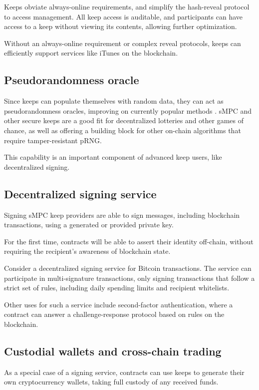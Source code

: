 \documentclass[11pt]{article}
\begin{document}
Keeps obviate always-online requirements, and simplify the hash-reveal
protocol to access management. All keep access is auditable, and
participants can have access to a keep without viewing its contents,
allowing further optimization.

Without an always-online requirement or complex reveal protocols,
keeps can efficiently support services like iTunes on the blockchain.

\subsection{Pseudorandomness oracle}

Since keeps can populate themselves with random data, they can act as
pseudorandomness oracles, improving on currently popular methods
\cite{prngStackexchange}. sMPC and other secure keeps are a good fit for
decentralized lotteries and other games of chance, as well as offering
a building block for other on-chain algorithms that require
tamper-resistant pRNG.

This capability is an important component of advanced keep users, like
decentralized signing.

\subsection{Decentralized signing service}

Signing sMPC keep providers are able to sign messages, including
blockchain transactions, using a generated or provided private key.

For the first time, contracts will be able to assert their identity
off-chain, without requiring the recipient's awareness of blockchain
state.

Consider a decentralized signing service for Bitcoin transactions. The
service can participate in multi-signature transactions, only signing
transactions that follow a strict set of rules, including daily
spending limits and recipient whitelists.

Other uses for such a service include second-factor authentication,
where a contract can answer a challenge-response protocol based on
rules on the blockchain.

\subsection{Custodial wallets and cross-chain trading}

As a special case of a signing service, contracts can use keeps to
generate their own cryptocurrency wallets, taking full custody of any
received funds.
\end{document}
